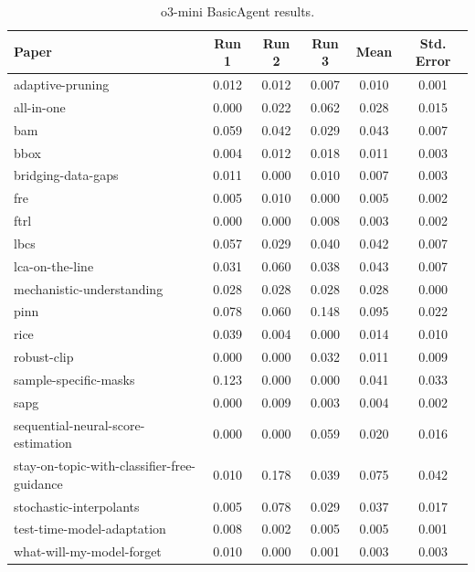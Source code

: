 \documentclass{article}
\theoremstyle{plain}
\theoremstyle{definition}
\theoremstyle{remark}
\begin{document}
\begin{table}[tb]
\caption{o3-mini BasicAgent results.}
\label{tab:o3-mini-results-basic}
\vskip 0.15in
\begin{center}
\begin{small}
\begin{sc}
\begin{tabular}{l c c c c c}
\toprule
\textbf{Paper} & \textbf{Run 1} & \textbf{Run 2} & \textbf{Run 3} & \textbf{Mean} & \textbf{Std. Error} \\
\midrule
adaptive-pruning & 0.012 & 0.012 & 0.007 & 0.010 & 0.001 \\
all-in-one & 0.000 & 0.022 & 0.062 & 0.028 & 0.015 \\
bam & 0.059 & 0.042 & 0.029 & 0.043 & 0.007 \\
bbox & 0.004 & 0.012 & 0.018 & 0.011 & 0.003 \\
bridging-data-gaps & 0.011 & 0.000 & 0.010 & 0.007 & 0.003 \\
fre & 0.005 & 0.010 & 0.000 & 0.005 & 0.002 \\
ftrl & 0.000 & 0.000 & 0.008 & 0.003 & 0.002 \\
lbcs & 0.057 & 0.029 & 0.040 & 0.042 & 0.007 \\
lca-on-the-line & 0.031 & 0.060 & 0.038 & 0.043 & 0.007 \\
mechanistic-understanding & 0.028 & 0.028 & 0.028 & 0.028 & 0.000 \\
pinn & 0.078 & 0.060 & 0.148 & 0.095 & 0.022 \\
rice & 0.039 & 0.004 & 0.000 & 0.014 & 0.010 \\
robust-clip & 0.000 & 0.000 & 0.032 & 0.011 & 0.009 \\
sample-specific-masks & 0.123 & 0.000 & 0.000 & 0.041 & 0.033 \\
sapg & 0.000 & 0.009 & 0.003 & 0.004 & 0.002 \\
sequential-neural-score-estimation & 0.000 & 0.000 & 0.059 & 0.020 & 0.016 \\
stay-on-topic-with-classifier-free-guidance & 0.010 & 0.178 & 0.039 & 0.075 & 0.042 \\
stochastic-interpolants & 0.005 & 0.078 & 0.029 & 0.037 & 0.017 \\
test-time-model-adaptation & 0.008 & 0.002 & 0.005 & 0.005 & 0.001 \\
what-will-my-model-forget & 0.010 & 0.000 & 0.001 & 0.003 & 0.003 \\
\bottomrule
\end{tabular}
\end{sc}
\end{small}
\end{center}
\vskip -0.1in
\end{table}
\end{document}
